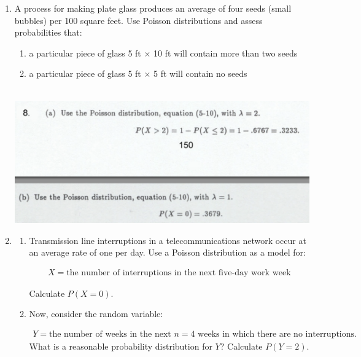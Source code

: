 \documentclass{article}\usepackage{graphicx, color}
\numberwithin{equation}{section}
\begin{document}
\begin{flushleft}
\begin{enumerate}[1. ]
\item A process for making plate glass produces an average of four seeds (small bubbles) per 100 square feet. Use Poisson distributions and assess probabilities that:

\begin{enumerate}
\item a particular piece of glass 5 ft $\times$ 10 ft will contain more than two seeds
\item a particular piece of glass 5 ft $\times$ 5 ft will contain no seeds
\end{enumerate}

$\quad$ \newline \includegraphics[scale=0.5,angle=0]{../../fig/4} \newline




\item \begin{enumerate}
\item 
Transmission line interruptions in a telecommunications network occur at an average rate of one per day. Use a Poisson distribution as a model for:

\begin{align*}
X = \text{the number of interruptions in the next five-day work week}
\end{align*}

Calculate $P(X = 0)$.


\item Now, consider the random variable:

\begin{align*}
Y = \text{the number of weeks in the next $n=4$ weeks in which there are no interruptions.}
\end{align*}
 What is a reasonable probability distribution for $Y$? Calculate $P(Y = 2)$. 


\end{enumerate} $\quad$ \newline


\end{enumerate}
\end{flushleft}
\end{document}
